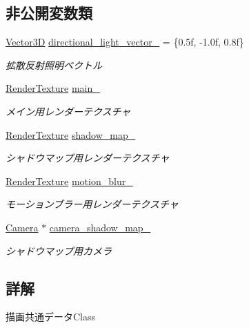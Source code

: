 \subsection*{非公開変数類}
\begin{DoxyCompactItemize}
\item 
\mbox{\hyperlink{class_vector3_d}{Vector3D}} \mbox{\hyperlink{class_draw_common_data_ad08d5a1d1a3de33977a1b4a2d7776343}{directional\+\_\+light\+\_\+vector\+\_\+}} = \{0.\+5f, -\/1.\+0f, 0.\+8f\}
\begin{DoxyCompactList}\small\item\em 拡散反射照明ベクトル \end{DoxyCompactList}\item 
\mbox{\hyperlink{class_render_texture}{Render\+Texture}} \mbox{\hyperlink{class_draw_common_data_a8fb17a79685424132ee5da7093de352d}{main\+\_\+}}
\begin{DoxyCompactList}\small\item\em メイン用レンダーテクスチャ \end{DoxyCompactList}\item 
\mbox{\hyperlink{class_render_texture}{Render\+Texture}} \mbox{\hyperlink{class_draw_common_data_a6cd0f6dae97b2058c9fff40b6a7cfc17}{shadow\+\_\+map\+\_\+}}
\begin{DoxyCompactList}\small\item\em シャドウマップ用レンダーテクスチャ \end{DoxyCompactList}\item 
\mbox{\hyperlink{class_render_texture}{Render\+Texture}} \mbox{\hyperlink{class_draw_common_data_a5f035e541464571beb8d2e2350981aab}{motion\+\_\+blur\+\_\+}}
\begin{DoxyCompactList}\small\item\em モーションブラー用レンダーテクスチャ \end{DoxyCompactList}\item 
\mbox{\hyperlink{class_camera}{Camera}} $\ast$ \mbox{\hyperlink{class_draw_common_data_a368fe7654d88cd5123429bd6a3f88d09}{camera\+\_\+shadow\+\_\+map\+\_\+}}
\begin{DoxyCompactList}\small\item\em シャドウマップ用カメラ \end{DoxyCompactList}\end{DoxyCompactItemize}


\subsection{詳解}
描画共通データ\+Class 

